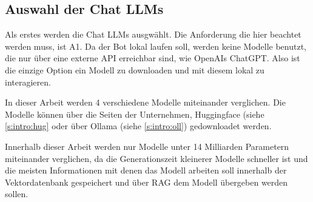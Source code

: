 \subsection{Auswahl der Chat LLMs}
Als erstes werden die Chat LLMs ausgwählt.
Die Anforderung die hier beachtet werden muss, ist A1. Da der Bot lokal laufen soll,
werden keine Modelle benutzt, die nur über eine externe API erreichbar sind, wie 
OpenAIs ChatGPT. Also ist die einzige Option ein Modell zu downloaden
und mit diesem lokal zu interagieren.\par 
In dieser Arbeit werden 4 verschiedene Modelle miteinander verglichen. Die Modelle können 
über die Seiten der Unternehmen, Huggingface (siehe \ref{s:intro:hug} oder über Ollama (siehe \ref{s:intro:oll}) gedownloadet werden.\par
Innerhalb dieser Arbeit werden nur Modelle unter 14 Milliarden Parametern miteinander verglichen, da die Generationszeit
kleinerer Modelle schneller ist und die meisten Informationen mit denen das Modell arbeiten soll innerhalb
der Vektordatenbank gespeichert und über RAG dem Modell übergeben werden sollen. 

